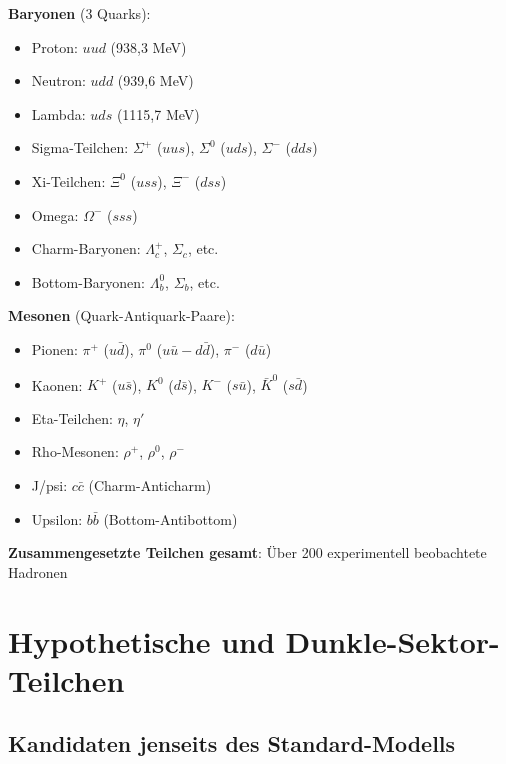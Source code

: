 	\textbf{Baryonen} (3 Quarks):
	\begin{itemize}
		\item Proton: $uud$ (938{,}3 MeV)
		\item Neutron: $udd$ (939{,}6 MeV)
		\item Lambda: $uds$ (1115{,}7 MeV)
		\item Sigma-Teilchen: $\Sigma^+$ ($uus$), $\Sigma^0$ ($uds$), $\Sigma^-$ ($dds$)
		\item Xi-Teilchen: $\Xi^0$ ($uss$), $\Xi^-$ ($dss$)
		\item Omega: $\Omega^-$ ($sss$)
		\item Charm-Baryonen: $\Lambda_c^+$, $\Sigma_c$, etc.
		\item Bottom-Baryonen: $\Lambda_b^0$, $\Sigma_b$, etc.
	\end{itemize}
	
	\textbf{Mesonen} (Quark-Antiquark-Paare):
	\begin{itemize}
		\item Pionen: $\pi^+$ ($u\bar{d}$), $\pi^0$ ($u\bar{u} - d\bar{d}$), $\pi^-$ ($d\bar{u}$)
		\item Kaonen: $K^+$ ($u\bar{s}$), $K^0$ ($d\bar{s}$), $K^-$ ($s\bar{u}$), $\bar{K}^0$ ($s\bar{d}$)
		\item Eta-Teilchen: $\eta$, $\eta'$
		\item Rho-Mesonen: $\rho^+$, $\rho^0$, $\rho^-$
		\item J/psi: $c\bar{c}$ (Charm-Anticharm)
		\item Upsilon: $b\bar{b}$ (Bottom-Antibottom)
	\end{itemize}
	
	\textbf{Zusammengesetzte Teilchen gesamt}: Über 200 experimentell beobachtete Hadronen
	
	\section{Hypothetische und Dunkle-Sektor-Teilchen}
	
	\subsection{Kandidaten jenseits des Standard-Modells}
	
